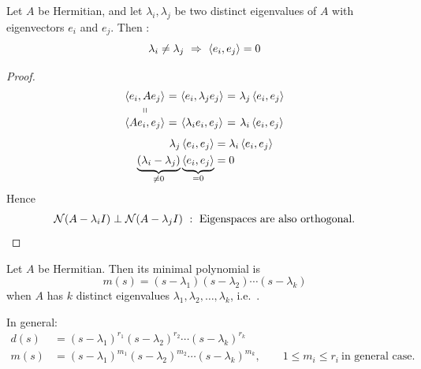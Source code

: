 \begin{theorem}
Let $A$ be Hermitian, and let $\lambda_i,\lambda_j$ be two distinct eigenvalues of $A$ with eigenvectors $e_i$ and $e_j$. Then :
\[
\lambda_i\neq\lambda_j\ \Rightarrow\ \inner{e_i}{e_j}=0
\]
\end{theorem}
\begin{proof}[Proof]
\[
\begin{array}{c@{\ }c@{\ }c@{\ }c@{\ }c}
\inner{e_i}{Ae_j} &=& \inner{e_i}{\lambda_je_j} &=& \lambda_j\inner{e_i}{e_j}\\
\shortparallel & & & & \\
\inner{Ae_i}{e_j} &=& \inner{\lambda_ie_i}{e_j} &=& \lambda_i\inner{e_i}{e_j}
\end{array}
\]
\begin{align*}
\lambda_j\left\langle e_i, e_j \right\rangle&=\lambda_i\left\langle e_i, e_j \right\rangle\\
\underbrace{(\lambda_i-\lambda_j)}_{\neq0}\underbrace{\left\langle e_i, e_j \right\rangle}_{=0}&=0
\end{align*}
Hence
\[
\Null(A-\lambda_iI)\perp\Null(A-\lambda_jI)\ :\ \text{Eigenspaces are also orthogonal.}\qedhere
\]
\end{proof}

\begin{theorem}
\leavevmode{}Let $A$ be Hermitian. Then its minimal polynomial is
\[
m(s)=(s-\lambda_1)(s-\lambda_2)\cdots(s-\lambda_k)
\]
when $A$ has $k$ distinct eigenvalues $\lambda_1,\lambda_2,\dots,\lambda_k$, i.e.\ .
\end{theorem}
In general:
\begin{align*}
d(s)&=(s-\lambda_1)^{r_1}(s-\lambda_2)^{r_2}\cdots(s-\lambda_k)^{r_k}\\
m(s)&=(s-\lambda_1)^{m_1}(s-\lambda_2)^{m_2}\cdots(s-\lambda_k)^{m_k},\qquad 1\leq m_i\leq r_i\ \text{in general case.}
\end{align*}

